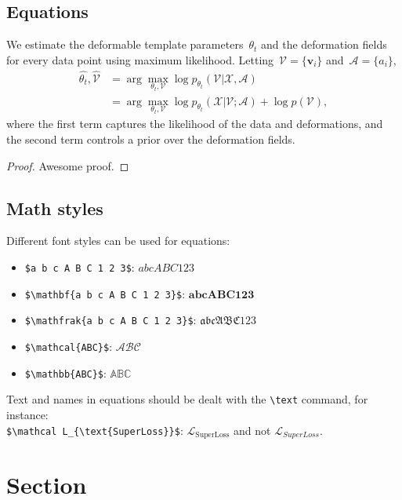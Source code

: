 \documentclass{melba}
\begin{document}
	\subsection{Equations}
		We estimate the deformable template parameters~$\theta_t$ and the deformation fields for every data point using maximum likelihood. Letting~$\mathcal{V} = \{\boldsymbol{v}_i\}$ and~$\mathcal{A} = \{a_i\}$,
		\begin{align}
			\hat{\theta_t}, \hat{\mathcal{V}} &= \arg \max_{\theta_t, \mathcal{V}} \log p_{\theta_t}(\mathcal{V} | \mathcal{X},  \mathcal{A}) \nonumber \\
			&= \arg \max_{\theta_t, \mathcal{V}} \log p_{\theta_t}(\mathcal{X} | \mathcal{V}; \mathcal{A}) + \log p(\mathcal{V}),
			\label{eq:logpost}
		\end{align}
		where the first term captures the likelihood of the data and deformations, and the second term controls a prior over the deformation fields.

		\begin{proof}
			Awesome proof.
		\end{proof}

	\subsection{Math styles}
		Different font styles can be used for equations:
		\begin{itemize}
			\item \verb|$a b c A B C 1 2 3$|: $ a b c A B C 1 2 3 $
			\item \verb|$\mathbf{a b c A B C 1 2 3}$|: $ \mathbf{a b c A B C 1 2 3} $
			\item \verb|$\mathfrak{a b c A B C 1 2 3}$|: $ \mathfrak{a b c A B C 1 2 3} $
			\item \verb|$\mathcal{ABC}$|: $ \mathcal{ABC} $
			\item \verb|$\mathbb{ABC}$|: $ \mathbb{ABC} $
		\end{itemize}

		Text and names in equations should be dealt with the \verb|\text| command, for instance:\\
		\verb|$\mathcal L_{\text{SuperLoss}}$|: $\mathcal L_{\text{SuperLoss}}$ and not $\mathcal L_{SuperLoss}$.



\section{Section}
\end{document}
